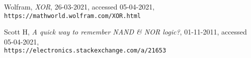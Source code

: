 \documentclass{article}
\begin{document}
    \begin{thebibliography}{10}
        Wolfram, \textit{XOR}, 26-03-2021, accessed 05-04-2021, \\\texttt{https://mathworld.wolfram.com/XOR.html}

        Scott H, \textit{A quick way to remember NAND \& NOR logic?}, 01-11-2011, accessed 05-04-2021, \\\texttt{https://electronics.stackexchange.com/a/21653}
    \end{thebibliography}
\end{document}
